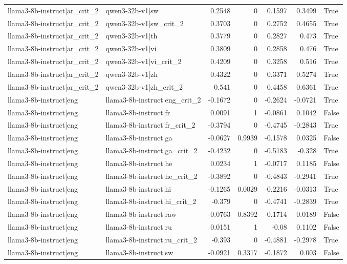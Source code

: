 \begin{table}
\begin{tabular}{l l r r r r l}
llama3-8b-instruct|ar_crit_2 & qwen3-32b-v1|sw & 0.2548 & 0 & 0.1597 & 0.3499 & True \\
llama3-8b-instruct|ar_crit_2 & qwen3-32b-v1|sw_crit_2 & 0.3703 & 0 & 0.2752 & 0.4655 & True \\
llama3-8b-instruct|ar_crit_2 & qwen3-32b-v1|th & 0.3779 & 0 & 0.2827 & 0.473 & True \\
llama3-8b-instruct|ar_crit_2 & qwen3-32b-v1|vi & 0.3809 & 0 & 0.2858 & 0.476 & True \\
llama3-8b-instruct|ar_crit_2 & qwen3-32b-v1|vi_crit_2 & 0.4209 & 0 & 0.3258 & 0.516 & True \\
llama3-8b-instruct|ar_crit_2 & qwen3-32b-v1|zh & 0.4322 & 0 & 0.3371 & 0.5274 & True \\
llama3-8b-instruct|ar_crit_2 & qwen3-32b-v1|zh_crit_2 & 0.541 & 0 & 0.4458 & 0.6361 & True \\
llama3-8b-instruct|eng & llama3-8b-instruct|eng_crit_2 & -0.1672 & 0 & -0.2624 & -0.0721 & True \\
llama3-8b-instruct|eng & llama3-8b-instruct|fr & 0.0091 & 1 & -0.0861 & 0.1042 & False \\
llama3-8b-instruct|eng & llama3-8b-instruct|fr_crit_2 & -0.3794 & 0 & -0.4745 & -0.2843 & True \\
llama3-8b-instruct|eng & llama3-8b-instruct|ga & -0.0627 & 0.9939 & -0.1578 & 0.0325 & False \\
llama3-8b-instruct|eng & llama3-8b-instruct|ga_crit_2 & -0.4232 & 0 & -0.5183 & -0.328 & True \\
llama3-8b-instruct|eng & llama3-8b-instruct|he & 0.0234 & 1 & -0.0717 & 0.1185 & False \\
llama3-8b-instruct|eng & llama3-8b-instruct|he_crit_2 & -0.3892 & 0 & -0.4843 & -0.2941 & True \\
llama3-8b-instruct|eng & llama3-8b-instruct|hi & -0.1265 & 0.0029 & -0.2216 & -0.0313 & True \\
llama3-8b-instruct|eng & llama3-8b-instruct|hi_crit_2 & -0.379 & 0 & -0.4741 & -0.2839 & True \\
llama3-8b-instruct|eng & llama3-8b-instruct|raw & -0.0763 & 0.8392 & -0.1714 & 0.0189 & False \\
llama3-8b-instruct|eng & llama3-8b-instruct|ru & 0.0151 & 1 & -0.08 & 0.1102 & False \\
llama3-8b-instruct|eng & llama3-8b-instruct|ru_crit_2 & -0.393 & 0 & -0.4881 & -0.2978 & True \\
llama3-8b-instruct|eng & llama3-8b-instruct|sw & -0.0921 & 0.3317 & -0.1872 & 0.003 & False \\

\end{tabular}
\end{table}
